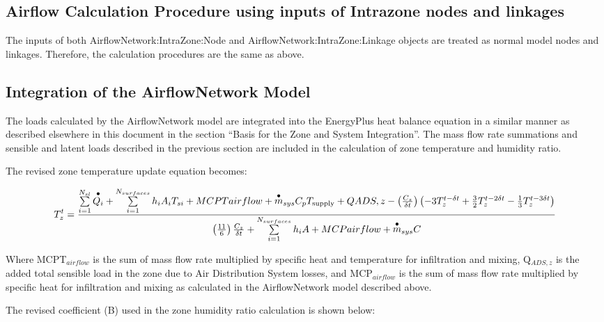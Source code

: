 \subsection{Airflow Calculation Procedure using inputs of Intrazone nodes and linkages}\label{airflow-calculation-procedure-using-inputs-of-intrazone-nodes-and-linkages}

The inputs of both AirflowNetwork:IntraZone:Node and AirflowNetwork:IntraZone:Linkage objects are treated as normal model nodes and linkages. Therefore, the calculation procedures are the same as above.

\subsection{Integration of the AirflowNetwork Model}\label{integration-of-the-airflownetwork-model}

The loads calculated by the AirflowNetwork model are integrated into the EnergyPlus heat balance equation in a similar manner as described elsewhere in this document in the section ``Basis for the Zone and System Integration''. The mass flow rate summations and sensible and latent loads described in the previous section are included in the calculation of zone temperature and humidity ratio.

The revised zone temperature update equation becomes:

{\scriptsize
\begin{equation}
T_z^t = \frac{{\sum\limits_{i = 1}^{{N_{sl}}} {\mathop {{Q_i}}\limits^ \bullet  }  + \sum\limits_{i = 1}^{{N_{surfaces}}} {{h_i}} {A_i}{T_{si}} + MCPTairflow + {{\mathop m\limits^ \bullet  }_{sys}}{C_p}{T_{{\rm{supply}}}} + QADS,z - \left( {\frac{{{C_z}}}{{\delta t}}} \right)\left( { - 3T_z^{t - \delta t} + \frac{3}{2}T_z^{t - 2\delta t} - \frac{1}{3}T_z^{t - 3\delta t}} \right)}}{{\left( {\frac{{11}}{6}} \right)\frac{{{C_z}}}{{\delta t}} + \sum\limits_{i = 1}^{{N_{surfaces}}} {{h_i}} A + MCPairflow + {{\mathop m\limits^ \bullet  }_{sys}}C}}
\end{equation}}

Where MCPT\(_{airflow}\) is the sum of mass flow rate multiplied by specific heat and temperature for infiltration and mixing, Q\(_{ADS,z}\) is the added total sensible load in the zone due to Air Distribution System losses, and MCP\(_{airflow}\) is the sum of mass flow rate multiplied by specific heat for infiltration and mixing as calculated in the AirflowNetwork model described above.

The revised coefficient (B) used in the zone humidity ratio calculation is shown below:

